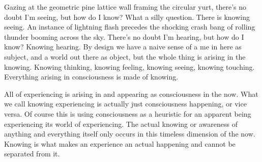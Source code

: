 \documentclass[12pt,openany]{book}
\begin{document}
Gazing at the geometric pine lattice wall framing the circular yurt, there's no doubt I'm seeing, but how do I know? What a silly question. There is knowing seeing. An instance of lightning flash precedes the shocking crash bang of rolling thunder booming across the sky. There's no doubt I'm hearing, but how do I know? Knowing hearing. By design we have a naive sense of a me in here as subject, and a world out there as object, but the whole thing is arising in the knowing. Knowing thinking, knowing feeling, knowing seeing, knowing touching. Everything arising in consciousness is made of knowing.

All of experiencing is arising in and appearing as consciousness in the now. What we call knowing experiencing is actually just consciousness happening, or vice versa. Of course this is using consciousness as a heuristic for an apparent being experiencing its world of experiencing. The actual knowing or awareness of anything and everything itself only occurs in this timeless dimension of the now. Knowing is what makes an experience an actual happening and cannot be separated from it.

\medskip
\end{document}
